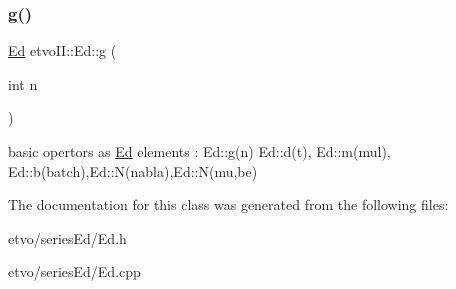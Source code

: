 \subsubsection{\texorpdfstring{g()}{g()}}
{\footnotesize\ttfamily \mbox{\hyperlink{classetvo_i_i_1_1_ed}{Ed}} etvo\+I\+I\+::\+Ed\+::g (\begin{DoxyParamCaption}\item[{int}]{n }\end{DoxyParamCaption})\hspace{0.3cm}{\ttfamily [static]}}

basic opertors as \mbox{\hyperlink{classetvo_i_i_1_1_ed}{Ed}} elements \+: Ed\+::g(n) Ed\+::d(t), Ed\+::m(mul), Ed\+::b(batch),Ed\+::\+N(nabla),Ed\+::\+N(mu,be) 

The documentation for this class was generated from the following files\+:\begin{DoxyCompactItemize}
\item 
etvo/series\+Ed/Ed.\+h\item 
etvo/series\+Ed/Ed.\+cpp\end{DoxyCompactItemize}
